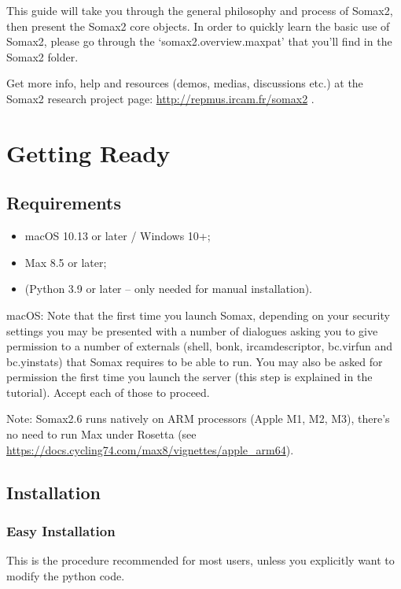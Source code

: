 This guide will take you through the general philosophy and process of Somax2, then present the Somax2 core objects. In order to quickly learn the basic use of Somax2, please go through the `somax2.overview.maxpat' that you'll find in the Somax2 folder.

Get more info, help and resources (demos, medias, discussions etc.) at the Somax2 research project page: \url{http://repmus.ircam.fr/somax2} .

\section{Getting Ready}

\subsection{Requirements}

\begin{itemize}
    \item macOS 10.13 or later / Windows 10+;
    \item Max 8.5 or later;
    \item (Python 3.9 or later -- only needed for manual installation).
\end{itemize}

macOS: Note that the first time you launch Somax, depending on your security settings you may be presented with a number of dialogues asking you to give permission to a number of externals (shell, bonk, ircamdescriptor, bc.virfun and bc.yinstats) that Somax requires to be able to run. You may also be asked for permission the first time you launch the server (this step is explained in the tutorial). Accept each of those to proceed.

Note: Somax2.6 runs natively on ARM processors (Apple M1, M2, M3), there's no need to run Max under Rosetta (see \url{https://docs.cycling74.com/max8/vignettes/apple_arm64}).

\subsection{Installation}

\subsubsection{Easy Installation}

This is the procedure recommended for most users, unless you explicitly want to modify the python code.

